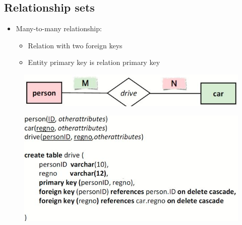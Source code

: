 \documentclass[conference]{IEEEtran}
\begin{document}
\subsection{Relationship sets}

\begin{itemize}
    \item Many-to-many relationship:
    \begin{itemize}
        \item Relation with two foreign keys 
        \item Entity primary key is relation primary key 
    \end{itemize}
\end{itemize}
\begin{figure} [h!]
    \centering
    \includegraphics[scale=0.5]{Ex24.JPG}
\end{figure}
\begin{figure} [h!]
    \centering
    \includegraphics[scale=0.5]{Ex25.JPG}
\end{figure}
\end{document}

